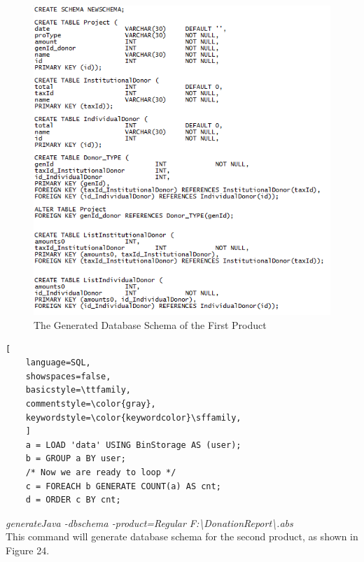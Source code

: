 \documentclass[runningheads,a4paper]{llncs}
\begin{document}
\begin{figure}
	\centering
	\includegraphics[scale=0.7]{create1.png}
	\caption{The Generated Database Schema of the First Product}
	\label{Figure 23}
\end{figure}

\begin{lstlisting}[
	language=SQL,
	showspaces=false,
	basicstyle=\ttfamily,
	commentstyle=\color{gray},
	keywordstyle=\color{keywordcolor}\sffamily,
	]
	a = LOAD 'data' USING BinStorage AS (user);
	b = GROUP a BY user;
	/* Now we are ready to loop */
	c = FOREACH b GENERATE COUNT(a) AS cnt;
	d = ORDER c BY cnt;
\end{lstlisting}


\emph{generateJava -dbschema -product=Regular F:\textbackslash DonationReport\textbackslash *.abs}\\

This command will generate database schema for the second product, as shown in Figure 24.\\
\end{document}
